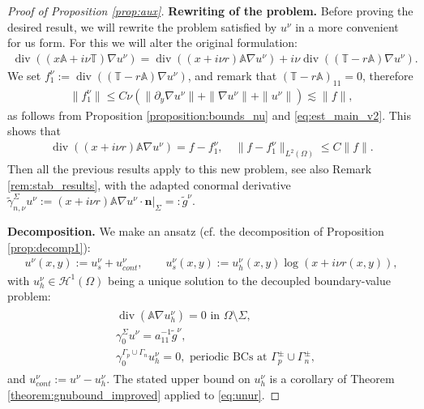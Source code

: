 \documentclass[report]{elsarticle}
\numberwithin{theorem}{section}
\renewcommand{\vec}[1]{\mathbf{#1}}
\begin{document}
\begin{proof}[Proof of Proposition \ref{prop:aux}]
	\textbf{Rewriting of the problem.}	Before proving the desired result, we will rewrite the problem satisfied by $u^{\nu}$ in a more convenient for us form. For this we will alter the original formulation:
	\begin{align*}
		\operatorname{div}((x\mathbb{A}+i\nu\mathbb{T})\nabla u^{\nu})=\operatorname{div}((x+i\nu r)\mathbb{A}\nabla u^{\nu})+i\nu \operatorname{div}((\mathbb{T}-r\mathbb{A})\nabla u^{\nu}).
	\end{align*}
	We set $
	f_{1}^{\nu}:=\operatorname{div}((\mathbb{T}-r\mathbb{A})\nabla u^{\nu})$, and remark that $(\mathbb{T}-r\mathbb{A})_{11}=0$, therefore 
	\begin{align}
		\label{eq:fcontnu}
		\|f_{1}^{\nu}\|\leq C \nu(\|\partial_y \nabla u^{\nu}\|+\|\nabla u^{\nu}\|+\|u^{\nu}\|)\lesssim \|f\|,
			\end{align}
	as follows from Proposition \ref{proposition:bounds_nu} and \eqref{eq:est_main_v2}. This shows that 
	\begin{align}
		\label{eq:unur}
		\operatorname{div}((x+i\nu r)\mathbb{A}\nabla u^{\nu})=f-f_1^{\nu}, \quad \|f-f_1^{\nu}\|_{L^2(\Omega)}\leq C\|f\|.
	\end{align}
	Then all the previous results apply to this new problem, see also Remark \ref{rem:stab_results}, with the adapted conormal derivative $\widetilde{\gamma}_{n,\nu}^{\Sigma}u^{\nu}:=\left.(x+i\nu r)\mathbb{A}\nabla u^{\nu}\cdot \vec{n}\right|_{\Sigma}=:\widetilde{g}^{\nu}$.
	
	\textbf{Decomposition.}	We make an ansatz (cf. the decomposition of Proposition \ref{prop:decomp1}):
	\begin{align*}
		u^{\nu}(x,y):=u^{\nu}_{s}+u^{\nu}_{cont},\qquad u^{\nu}_{s}(x,y):=u^{\nu}_{h}(x,y)\log\left(x+i\nu r(x,y)\right), 
	\end{align*}
	with $u^{\nu}_h\in \mathcal{H}^1(\Omega)$ being a unique solution to the decoupled boundary-value problem: 
	\begin{align}
		\label{eq:unuh}
		\begin{split}
			&\operatorname{div}(\mathbb{A}\nabla u^{\nu}_h)=0 \text{ in }\Omega\setminus \Sigma,\\
			&\gamma_{0}^{\Sigma}u^{\nu}=a_{11}^{-1}\widetilde{g}^{\nu},\\
			&\gamma_0^{\Gamma_p\cup\Gamma_n}u^{\nu}_h=0,  \text{ periodic BCs at }\Gamma^{\pm}_p\cup\Gamma^{\pm}_n,
		\end{split}
	\end{align}
	and $u^{\nu}_{cont}:=u^{\nu}-u^{\nu}_h$. The stated upper bound on $u^{\nu}_h$ is a corollary of Theorem \ref{theorem:gnubound_improved} applied to \eqref{eq:unur}. 
	

\end{proof}
\end{document}

